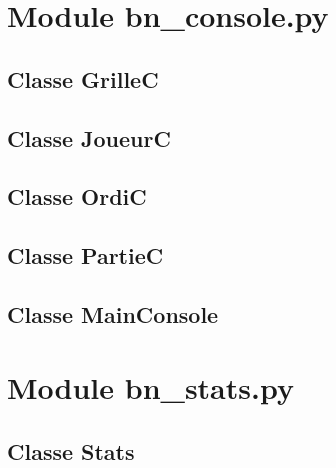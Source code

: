 \section{Module bn\_console.py}
\subsection{Classe GrilleC}


\subsection{Classe JoueurC}


\subsection{Classe OrdiC}


\subsection{Classe PartieC}


\subsection{Classe MainConsole}


\section{Module bn\_stats.py}
\subsection{Classe Stats}
